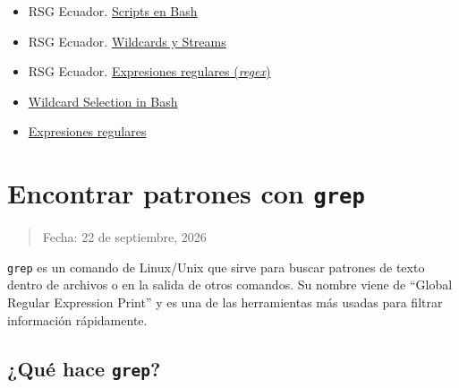 \documentclass[
  spanish,
  12pt,
  letterpaper,
  DIV=11,
  numbers=noendperiod]{scrreprt}
\providecommand{\tightlist}{%
  \setlength{\itemsep}{0pt}\setlength{\parskip}{0pt}}
\begin{document}
\begin{itemize}
\tightlist
\item
  RSG Ecuador.
  \href{https://rsg-ecuador.github.io/unix.bioinfo.rsgecuador/content/Curso_avanzado/02_Bash/1_bash.html}{Scripts
  en Bash}
\item
  RSG Ecuador.
  \href{https://rsg-ecuador.github.io/unix.bioinfo.rsgecuador/content/Curso_basico/03_Manejo_terminal/5_wildcards.html}{Wildcards
  y Streams}
\item
  RSG Ecuador.
  \href{https://rsg-ecuador.github.io/unix.bioinfo.rsgecuador/content/Curso_basico/04_Procesamiento_ficheros_regex_pipes/3_Expresiones_regulares.html}{Expresiones
  regulares (\emph{regex})}
\item
  \href{https://pressbooks.senecapolytechnic.ca/uli101/chapter/wildcard-selection-in-bash/}{Wildcard
  Selection in Bash}
\item
  \href{https://twiki.org/cgi-bin/view/Codev/TWikiPresentation2017x06x01Regex}{Expresiones
  regulares}
\end{itemize}

\chapter{\texorpdfstring{Encontrar patrones con
\texttt{grep}}{Encontrar patrones con grep}}\label{encontrar-patrones-con-grep}

\begin{quote}
Fecha: 22 de septiembre, 2026
\end{quote}

\texttt{grep} es un comando de Linux/Unix que sirve para buscar patrones
de texto dentro de archivos o en la salida de otros comandos. Su nombre
viene de ``Global Regular Expression Print'' y es una de las
herramientas más usadas para filtrar información rápidamente.

\section{\texorpdfstring{¿Qué hace
\texttt{grep}?}{¿Qué hace grep?}}\label{quuxe9-hace-grep}
\end{document}
